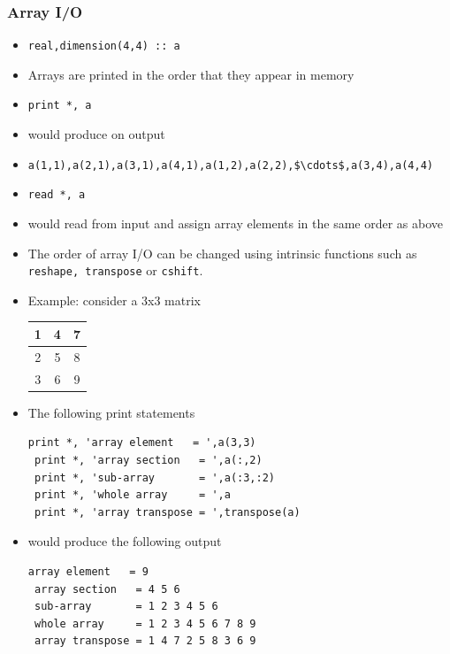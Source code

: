 \documentclass[c,mathserif,compress,xcolor=svgnames]{beamer}
\newcommand{\lstfortran}[1]{\lstinline[language={[90]Fortran},basicstyle=\footnotesize\ttfamily]|#1|}
\begin{document}
\begin{frame}
  \frametitle{\small Array I/O}
  \begin{itemize}
    \item[] \lstfortran{real,dimension(4,4) :: a}
    \item Arrays are printed in the order that they appear in memory
    \item[] \lstfortran{print *, a}
    \item[] would produce on output
    \item[] \lstinline[mathescape]{a(1,1),a(2,1),a(3,1),a(4,1),a(1,2),a(2,2),$\cdots$,a(3,4),a(4,4)}
    \item[] \lstfortran{read *, a}
    \item[] would read from input and assign array elements in the same order as above
    \item The order of array I/O can be changed using intrinsic functions such as \lstfortran{reshape, transpose} or \lstfortran{cshift}.
      \framebreak
    \item Example: consider a 3x3 matrix
      \begin{center}
        \begin{tabular}{|c|c|c|}
          \hline
          1 & 4 & 7 \\ \hline
          2 & 5 & 8 \\ \hline
          3 & 6 & 9 \\ \hline
        \end{tabular}
      \end{center}
      \item The following print statements
        \begin{lstlisting}[language={[90]Fortran}]
 print *, 'array element   = ',a(3,3)
 print *, 'array section   = ',a(:,2)
 print *, 'sub-array       = ',a(:3,:2)
 print *, 'whole array     = ',a
 print *, 'array transpose = ',transpose(a)
        \end{lstlisting}
      \item would produce the following output
        \begin{Verbatim}[formatcom=\color{indigo}]
 array element   = 9
 array section   = 4 5 6
 sub-array       = 1 2 3 4 5 6
 whole array     = 1 2 3 4 5 6 7 8 9
 array transpose = 1 4 7 2 5 8 3 6 9
        \end{Verbatim}
    \end{itemize}
\end{frame}
\end{document}
